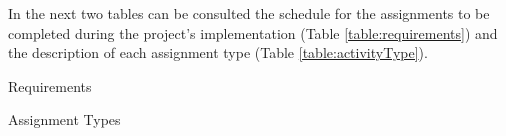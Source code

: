 In the next two tables can be consulted the schedule for the assignments to be completed during the project's implementation (Table \ref{table:requirements}) and the description of each assignment type (Table \ref{table:activityType}).
\begin{center}
	\begin{table}[H]
		\caption{Requirements}
  		
  		\label{table:requirements}
	\end{table}
\end{center}

\begin{center}
	\begin{table}[H]
		\caption{Assignment Types}
  		\label{table:activityType}
	\end{table}
\end{center}